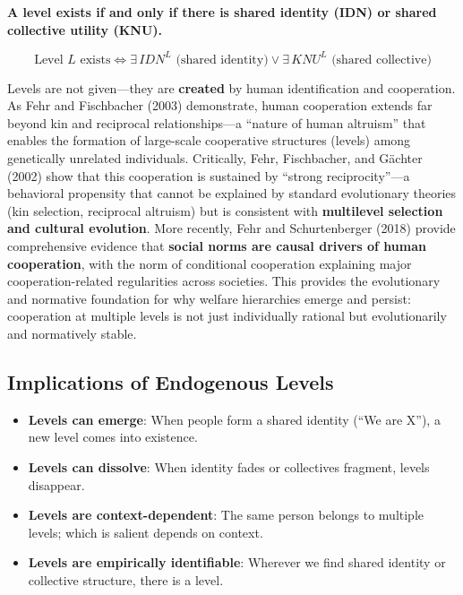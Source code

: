 \documentclass[12pt,a4paper]{article}
\begin{document}
\begin{tcolorbox}[colback=blue!5!white, colframe=blue!75!black, title=The Endogeneity Principle]
\textbf{A level exists if and only if there is shared identity (IDN) or 
shared collective utility (KNU).}

\begin{equation}
\boxed{
\text{Level } L \text{ exists} \iff \exists \, IDN^L \text{ (shared identity)} \lor \exists \, KNU^L \text{ (shared collective)}
}
\label{eq:endogeneity}
\end{equation}

Levels are not given---they are \textbf{created} by human identification and cooperation.
As Fehr and Fischbacher (2003) demonstrate, human cooperation extends far beyond 
kin and reciprocal relationships---a ``nature of human altruism'' that enables 
the formation of large-scale cooperative structures (levels) among genetically 
unrelated individuals. Critically, Fehr, Fischbacher, and Gächter (2002) show 
that this cooperation is sustained by ``strong reciprocity''---a behavioral 
propensity that cannot be explained by standard evolutionary theories (kin 
selection, reciprocal altruism) but is consistent with \textbf{multilevel 
selection and cultural evolution}. More recently, Fehr and Schurtenberger (2018) 
provide comprehensive evidence that \textbf{social norms are causal drivers of 
human cooperation}, with the norm of conditional cooperation explaining major 
cooperation-related regularities across societies. This provides the evolutionary 
and normative foundation for why welfare hierarchies emerge and persist: 
cooperation at multiple levels is not just individually rational but 
evolutionarily and normatively stable.
\end{tcolorbox}

\subsection{Implications of Endogenous Levels}

\begin{itemize}[nosep]
\item \textbf{Levels can emerge}: When people form a shared identity (``We are X''), 
a new level comes into existence.
\item \textbf{Levels can dissolve}: When identity fades or collectives fragment, 
levels disappear.
\item \textbf{Levels are context-dependent}: The same person belongs to multiple 
levels; which is salient depends on context.
\item \textbf{Levels are empirically identifiable}: Wherever we find shared 
identity or collective structure, there is a level.
\end{itemize}
\end{document}
